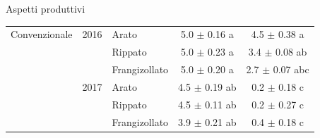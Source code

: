 \documentclass[10pt]{beamer}
\begin{document}
\begin{frame}{Aspetti produttivi}
{\begin{table}[ht]
\begin{tabular}{lllcc}
        Convenzionale& 2016 & Arato         & 5.0 $\pm$ 0.16 a   & 4.5 $\pm$ 0.38 a \\ 
                     &      & Rippato       & 5.0 $\pm$ 0.23 a   & 3.4 $\pm$ 0.08 ab \\ 
                     &      & Frangizollato & 5.0 $\pm$ 0.20 a   & 2.7 $\pm$ 0.07 abc\\ 
                     & 2017 & Arato         & 4.5 $\pm$ 0.19 ab  & 0.2 $\pm$ 0.18 c \\ 
                     &      & Rippato       & 4.5 $\pm$ 0.11 ab  & 0.2 $\pm$ 0.27 c \\ 
                     &      & Frangizollato & 3.9 $\pm$ 0.21 ab  & 0.4 $\pm$ 0.18 c \\ 
        \hline
      \end{tabular}
    \end{table}}



\end{frame}



\begin{frame}
\end{frame}

\appendix
\end{document}
